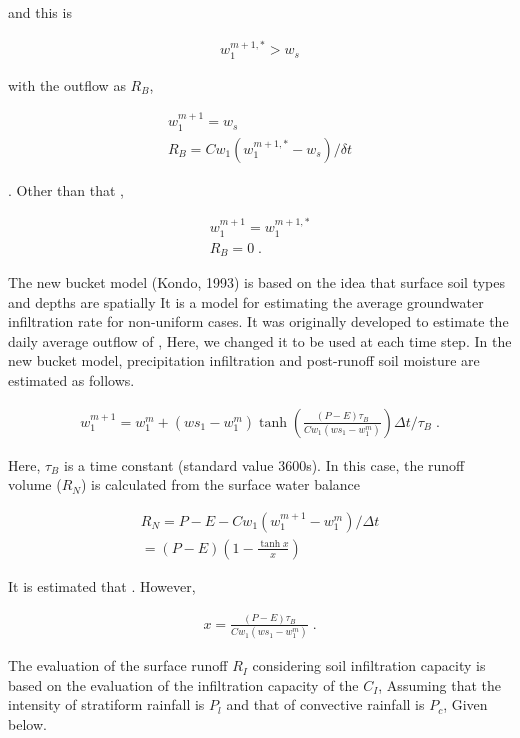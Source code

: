 and this is

\begin{eqnarray}
 w_1^{m+1,*} > w_s 
\end{eqnarray}

with the outflow as \(R_B\),

\begin{eqnarray}
  w_1^{m+1}  =  w_s \\
  R_B   =   Cw_1 ( w_1^{m+1,*} - w_s )/\delta t
\end{eqnarray}

. Other than that ,

\begin{eqnarray}
  w_1^{m+1}  =   w_1^{m+1,*} \\
  R_B        =   0                  \; .
\end{eqnarray}

The new bucket model (Kondo, 1993) is based on the idea that surface
soil types and depths are spatially It is a model for estimating the
average groundwater infiltration rate for non-uniform cases. It was
originally developed to estimate the daily average outflow of , Here, we
changed it to be used at each time step. In the new bucket model,
precipitation infiltration and post-runoff soil moisture are estimated
as follows.

\begin{eqnarray}
w_1^{m+1} = w_1^m + ( ws_1 - w_1^m ) 
\tanh\left( \frac{(P-E)\tau_B}{Cw_1(ws_1 - w_1^m)} \right) 
\Delta t / \tau_B \; .
\end{eqnarray}

Here, \(\tau_B\) is a time constant (standard value 3600s). In this
case, the runoff volume (\(R_N\)) is calculated from the surface water
balance

\begin{eqnarray}
     R_N  =  P - E - Cw_1 ( w_1^{m+1} - w_1^m ) / \Delta t \\
          =  (P - E) \left( 1 - \frac{\tanh x}{x} \right)
\end{eqnarray}

It is estimated that . However,

\begin{eqnarray}
  x = \frac{(P-E)\tau_B}{Cw_1(ws_1 - w_1^m)} \; .
\end{eqnarray}

The evaluation of the surface runoff \(R_I\) considering soil
infiltration capacity is based on the evaluation of the infiltration
capacity of the \(C_I\), Assuming that the intensity of stratiform
rainfall is \(P_l\) and that of convective rainfall is \(P_c\), Given
below.

